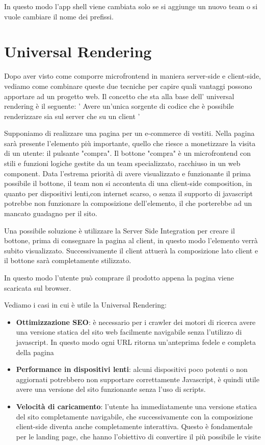 In questo modo l'app shell viene cambiata solo se si aggiunge un nuovo team o si vuole cambiare il nome dei prefissi.



\pagebreak
\section{Universal Rendering}
Dopo aver visto come comporre microfrontend in maniera server-side e client-side, vediamo come combinare queste due tecniche
per capire quali vantaggi possono apportare ad un progetto web.
Il concetto che sta alla base dell' universal rendering è il seguente:
' Avere un'unica sorgente di codice che è possibile renderizzare sia sul server che su un client ' \cite{ssr}

Supponiamo di realizzare una pagina per un e-commerce di vestiti.
Nella pagina sarà presente l'elemento più importante, quello che riesce a monetizzare la visita di un utente: il pulsante "compra".
Il bottone "compra" è un microfrontend con stili e funzioni logiche gestite da un team specializzato, racchiuso in un web component.
Data l'estrema priorità di avere visualizzato e funzionante il prima possibile il bottone, il team non si accontenta di una client-side composition,
in quanto per dispositivi lenti,con internet scarso, o senza il supporto di javascript potrebbe non funzionare la composizione dell'elemento, 
il che porterebbe ad un mancato guadagno per il sito.

Una possibile soluzione è utilizzare la Server Side Integration per creare il bottone, prima di consegnare la pagina al client, in questo modo l'elemento 
verrà subito visualizzato. Successivamente il client attuerà la composizione lato client e il bottone sarà completamente stilizzato.

In questo modo l'utente può comprare il prodotto appena la pagina viene scaricata sul browser.

Vediamo i casi in cui è utile la Universal Rendering: \cite{angularUniversal}
\begin{itemize}
    \item \textbf{Ottimizzazione SEO}: è necessario per i crawler dei motori di ricerca avere una versione statica del sito web
    facilmente navigabile senza l'utilizzo di javascript. In questo modo ogni URL ritorna un'anteprima fedele e completa della pagina
    \item \textbf{Performance in dispositivi lenti}: alcuni dispositivi poco potenti o non aggiornati potrebbero non supportare correttamente
    Javascript, è quindi utile avere una versione del sito funzionante senza l'uso di scripts.
    \item \textbf{Velocità di caricamento}: l'utente ha immediatamente una versione statica del sito completamente navigabile, che successivamente
    con la composizione client-side diventa anche completamente interattiva. Questo è fondamentale per le landing page, che hanno l'obiettivo di convertire il più 
    possibile le visite
\end{itemize}


